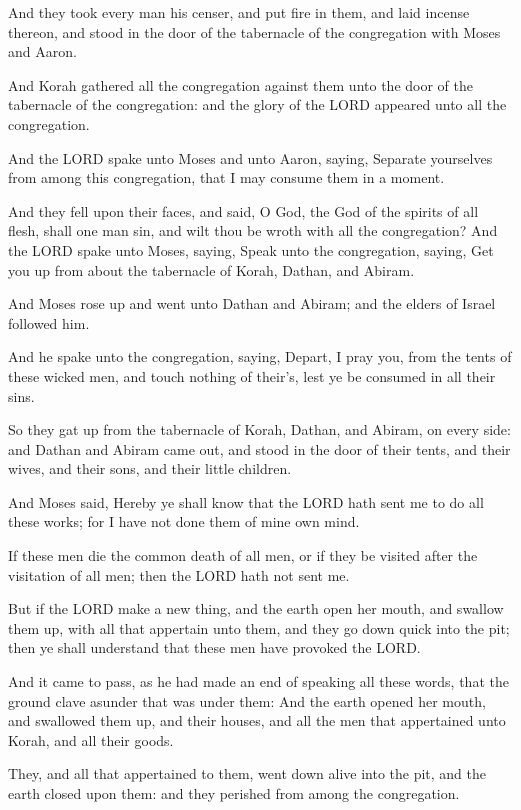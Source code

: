 \Verse And they took every man his censer, and put fire in them, and
laid incense thereon, and stood in the door of the tabernacle of the
congregation with Moses and Aaron.

\Verse And Korah gathered all the congregation against them unto the
door of the tabernacle of the congregation: and the glory of the LORD
appeared unto all the congregation.

\Verse And the LORD spake unto Moses and unto Aaron, saying, \Verse
Separate yourselves from among this congregation, that I may consume
them in a moment.

\Verse And they fell upon their faces, and said, O God, the God of the
spirits of all flesh, shall one man sin, and wilt thou be wroth with
all the congregation?  \Verse And the LORD spake unto Moses, saying,
\Verse Speak unto the congregation, saying, Get you up from about the
tabernacle of Korah, Dathan, and Abiram.

\Verse And Moses rose up and went unto Dathan and Abiram; and the
elders of Israel followed him.

\Verse And he spake unto the congregation, saying, Depart, I pray you,
from the tents of these wicked men, and touch nothing of their's, lest
ye be consumed in all their sins.

\Verse So they gat up from the tabernacle of Korah, Dathan, and Abiram,
on every side: and Dathan and Abiram came out, and stood in the door
of their tents, and their wives, and their sons, and their little
children.

\Verse And Moses said, Hereby ye shall know that the LORD hath sent me
to do all these works; for I have not done them of mine own mind.

\Verse If these men die the common death of all men, or if they be
visited after the visitation of all men; then the LORD hath not sent
me.

\Verse But if the LORD make a new thing, and the earth open her mouth,
and swallow them up, with all that appertain unto them, and they go
down quick into the pit; then ye shall understand that these men have
provoked the LORD.

\Verse And it came to pass, as he had made an end of speaking all these
words, that the ground clave asunder that was under them: \Verse And
the earth opened her mouth, and swallowed them up, and their houses,
and all the men that appertained unto Korah, and all their goods.

\Verse They, and all that appertained to them, went down alive into the
pit, and the earth closed upon them: and they perished from among the
congregation.

